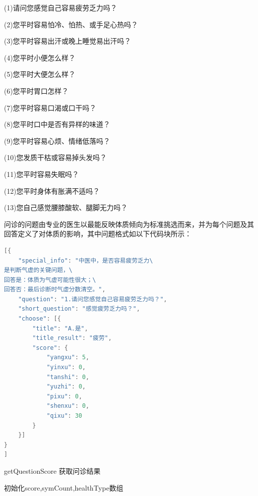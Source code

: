 (1)请问您感觉自己容易疲劳乏力吗？

(2)您平时容易怕冷、怕热、或手足心热吗？

(3)您平时容易出汗或晚上睡觉易出汗吗？

(4)您平时小便怎么样？

(5)您平时大便怎么样？

(6)您平时胃口怎样？

(7)您平时容易口渴或口干吗？

(8)您平时口中是否有异样的味道？

(9)您平时容易心烦、情绪低落吗？

(10)您发质干枯或容易掉头发吗？

(11)您平时容易失眠吗？

(12)您平时身体有胀满不适吗？

(13)您自己感觉腰膝酸软、腿脚无力吗？

问诊的问题由专业的医生以最能反映体质倾向为标准挑选而来，并为每个问题及其回答定义了对体质的影响，其中问题格式如以下代码块所示：
\begin{lstlisting}[language={C}, title=问题1格式, label={lst:questions}, basicstyle=\normalsize]
[{
    "special_info": "中医中，是否容易疲劳乏力\
是判断气虚的关键问题，\
回答是：体质为气虚可能性很大；\
回答否：最后诊断时气虚分数清空。",
    "question": "1.请问您感觉自己容易疲劳乏力吗？",
    "short_question": "感觉疲劳乏力吗？",
    "choose": [{
        "title": "A.是",
        "title_result": "疲劳",
        "score": {
            "yangxu": 5,
            "yinxu": 0,
            "tanshi": 0,
            "yuzhi": 0,
            "pixu": 0,
            "shenxu": 0,
            "qixu": 30
        }
    }]
}
]
\end{lstlisting}

\begin{algorithm}[htbp]
\caption{getQuestionScore 获取问诊结果\cite{张红凯2018基于舌}}%
\label{alg:question_score}
\LinesNumbered %
\KwIn{questions 问诊数据}%
初始化score,symCount,healthType数组\\
\end{algorithm}

